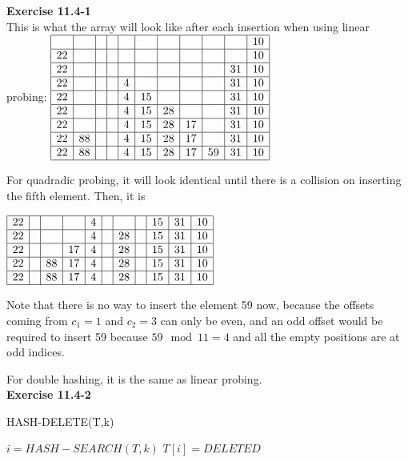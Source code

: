 \documentclass{article}
\begin{document}
\noindent\textbf{ Exercise 11.4-1} \\

This is what the array will look like after each insertion when using linear probing:
$
\begin{array}{|c|c|c|c|c|c|c|c|c|c|c|}
\hline
&&&&&&&&&&10\\
\hline
22&&&&&&&&&&10\\
\hline
22&&&&&&&&&31&10\\
\hline
22&&&&4&&&&&31&10\\
\hline
22&&&&4&15&&&&31&10\\
\hline
22&&&&4&15&28&&&31&10\\
\hline
22&&&&4&15&28&17&&31&10\\
\hline
22&88&&&4&15&28&17&&31&10\\
\hline
22&88&&&4&15&28&17&59&31&10\\
\hline
\end{array}
$

For quadradic probing, it will look identical until there is a collision on inserting the fifth element. Then, it is

$
\begin{array}{|c|c|c|c|c|c|c|c|c|c|c|}
\hline
22&&&&4&&&&15&31&10\\
\hline
22&&&&4&&28&&15&31&10\\
\hline
22&&&17&4&&28&&15&31&10\\
\hline
22&&88&17&4&&28&&15&31&10\\
\hline
22&&88&17&4&&28&&15&31&10\\
\hline
\end{array}
$ 

Note that there is no way to insert the element 59 now, because the offsets coming from $c_1 =1$ and $c_2 =3$ can only be even, and an odd offset would be required to insert 59 because $59 \mod 11 = 4$ and all the empty positions are at odd indices.

For double hashing, it is the same as linear probing. \\

\noindent\textbf{Exercise 11.4-2}\\

\begin{algorithm}
\caption{HASH-DELETE(T,k)}
\begin{algorithmic}
\State $i = HASH-SEARCH(T,k)$
\State $T[i] = DELETED$
\end{algorithmic}
\end{algorithm}
\end{document}
